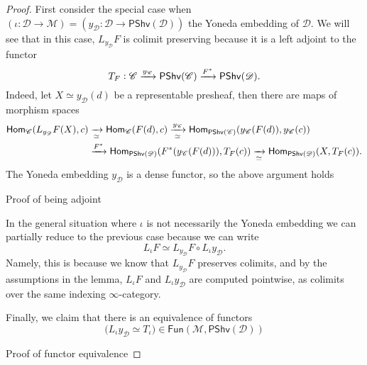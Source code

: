 \documentclass[../text.tex]{subfiles}
\begin{document}
\begin{proof}
    First consider the special case when $(\iota: \mathscr{D} \xrightarrow{} \mathscr{M}) = (y_{\mathscr{D}}: \mathscr{D} \xrightarrow{} \mathsf{PShv}(\mathscr{D}))$ the Yoneda embedding of $\mathscr{D}$. We will see that in this case, $L_{y_{\mathscr{D}}} F$ is colimit preserving because it is a left adjoint to the functor
    \begin{equation}
        T_F: \mathscr{C} \xrightarrow{y_{\mathscr{C}}} \mathsf{PShv} (\mathscr{C}) \xrightarrow{F^*} \mathsf{PShv} (\mathscr{D}).
    \end{equation}
    Indeed, let $X \simeq y_{\mathscr{D}} (d)$ be a representable presheaf, then there are maps of morphism spaces
    \begin{align}
        \mathsf{Hom}_{\mathscr{C}} (L_{y_{\mathscr{D}}} F (X), c) &\xrightarrow[\simeq]{} \mathsf{Hom}_{\mathscr{C}} (F (d), c) \xrightarrow[\simeq]{y_{\mathscr{C}}} \mathsf{Hom}_{\mathsf{PShv}(\mathscr{C})} (y_{\mathscr{C}}(F(d)), y_{\mathscr{C}}(c))\notag\\ &\xrightarrow{F^*} \mathsf{Hom}_{\mathsf{PShv}(\mathscr{D})} (F^*(y_{\mathscr{C}}(F(d))), T_F(c)) \xrightarrow[\simeq]{} \mathsf{Hom}_{\mathsf{PShv}(\mathscr{D})} (X, T_F(c)).
    \end{align}
    The Yoneda embedding $y_{\mathscr{D}}$ is a dense functor, so the above argument holds  
    
    {\color{red} Proof of being adjoint}

    In the general situation where $\iota$ is not necessarily the Yoneda embedding we can partially reduce to the previous case because we can write
    \begin{equation}
        L_{\iota} F \simeq L_{y_{\mathscr{D}}}F \circ L_{\iota} y_{\mathscr{D}}.
    \end{equation}
    Namely, this is because we know that $L_{y_{\mathscr{D}}} F$ preserves colimits, and by the assumptions in the lemma, $L_{\iota} F$ and $L_{\iota} y_{\mathscr{D}}$ are computed pointwise, as colimits over the same indexing $\infty$-category.

    Finally, we claim that there is an equivalence of functors
    \begin{equation}
        \Big( L_{\iota} y_{\mathscr{D}} \simeq T_{\iota} \Big) \in \mathsf{Fun}(\mathscr{M}, \mathsf{PShv}(\mathscr{D})) 
    \end{equation}

    {\color{red} Proof of functor equivalence}
    
\end{proof}
\end{document}
